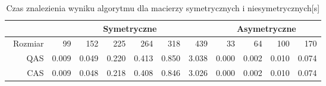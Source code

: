 \begin{table}
\centering
\begin{tabular}{|r|r|r|r|r|r|r|r|r|r|r|}
\hline
 & \multicolumn{6}{|c|}{Symetryczne} & \multicolumn{4}{|c|}{Asymetryczne} \\ \hline\
Rozmiar & 99 & 152 & 225 & 264 & 318 & 439 & 33 & 64 & 100 & 170 \\ \hline
QAS & 0.009 & 0.049 & 0.220 & 0.413 & 0.850 & 3.038 & 0.000 & 0.002 & 0.010 & 0.074 \\
CAS & 0.009 & 0.048 & 0.218 & 0.408 & 0.846 & 3.026 & 0.000 & 0.002 & 0.010 & 0.074 \\ \hline
\end{tabular}
\caption{Czas znalezienia wyniku algorytmu dla macierzy symetrycznych i niesymetrycznych[s]}
\label{tab:time_AoFeroMet}
\end{table}
